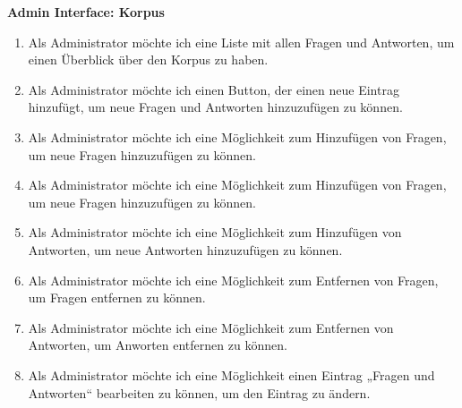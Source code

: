 \textbf{Admin Interface: Korpus}
\begin{enumerate}
    \item Als Administrator möchte ich eine Liste mit allen Fragen und Antworten, um einen Überblick über den Korpus zu haben.
    \item Als Administrator möchte ich einen Button, der einen neue Eintrag hinzufügt, um neue Fragen und Antworten hinzuzufügen zu können.
    \item Als Administrator möchte ich eine Möglichkeit zum Hinzufügen von Fragen, um neue Fragen hinzuzufügen zu können.
    \item Als Administrator möchte ich eine Möglichkeit zum Hinzufügen von Fragen, um neue Fragen hinzuzufügen zu können.
    \item Als Administrator möchte ich eine Möglichkeit zum Hinzufügen von Antworten, um neue Antworten hinzuzufügen zu können.
    \item Als Administrator möchte ich eine Möglichkeit zum Entfernen von Fragen, um Fragen entfernen zu können.
    \item Als Administrator möchte ich eine Möglichkeit zum Entfernen von Antworten, um Anworten entfernen zu können.
    \item Als Administrator möchte ich eine Möglichkeit einen Eintrag „Fragen und Antworten“ bearbeiten zu können, um den Eintrag zu ändern.
\end{enumerate}


